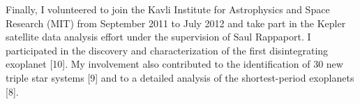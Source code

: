 \documentclass[letterpaper,12pt,onecolumn]{article}
\begin{document}
Finally, I volunteered to join the Kavli Institute for Astrophysics and Space Research (MIT) from September 2011 to July 2012 and take part in the Kepler satellite data analysis effort under the supervision of Saul Rappaport. I participated in the discovery and characterization of the first disintegrating exoplanet [10]. My involvement also contributed to the identification of 30 new triple star systems [9] and to a detailed analysis of the shortest-period exoplanets [8].
\end{document}
